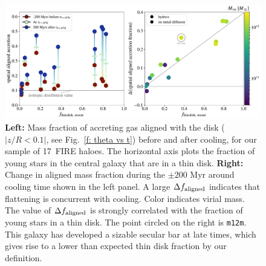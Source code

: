 \documentclass[fleqn,usenatbib]{mnras}
\newcommand{\Nsample}{17}
\begin{document}
\begin{figure}
    \centering
    \includegraphics[width=\textwidth]{figures/prevalence/aligned_fraction.pdf}
    \caption{
    \textbf{Left:}
    Mass fraction of accreting gas aligned with the disk ($\vert z/R < 0.1 \vert$, see Fig.~\ref{f: theta vs t}) before and after cooling, for our sample of \Nsample~FIRE haloes.
    The horizontal axis plots the fraction of young stars in the central galaxy that are in a thin disk.
    \textbf{Right:}
    Change in aligned mass fraction during the $\pm200$ Myr around cooling time shown in the left panel.
    A large $\Delta f_{\rm aligned}$ indicates that flattening is concurrent with cooling.
    Color indicates virial mass.
    The value of $\Delta f_{\rm aligned}$ is strongly correlated with the fraction of young stars in a thin disk. %
    The point circled on the right is \texttt{m12m}.
    This galaxy has developed a sizable secular bar at late times, which gives rise to a lower than expected thin disk fraction by our definition.
    }
    \label{f: prevalence}
\end{figure}
\end{document}
